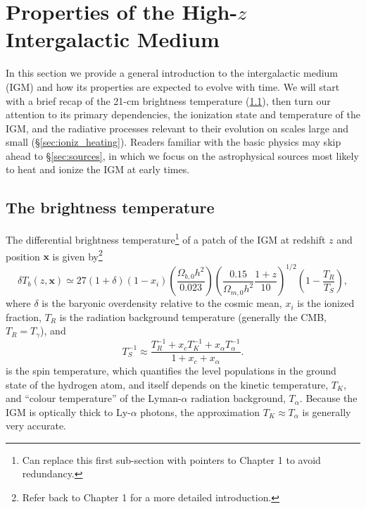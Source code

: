 \section{Properties of the High-$z$ Intergalactic Medium} \label{sec:igm}
In this section we provide a general introduction to the intergalactic medium (IGM) and how its properties are expected to evolve with time. We will start with a brief recap of the 21-cm brightness temperature (\ref{sec:dTb}), then turn our attention to its primary dependencies, the ionization state and temperature of the IGM, and the radiative processes relevant to their evolution on scales large and small (\S\ref{sec:ioniz_heating}). Readers familiar with the basic physics may skip ahead to \S\ref{sec:sources}, in which we focus on the astrophysical sources most likely to heat and ionize the IGM at early times.

\subsection{The brightness temperature} \label{sec:dTb}
The differential brightness temperature\footnote{Can replace this first sub-section with pointers to Chapter 1 to avoid redundancy.} of a patch of the IGM at redshift $z$ and position $\mathbf{x}$ is given by\footnote{Refer back to Chapter 1 for a more detailed introduction.} 
\begin{equation}
    \delta T_b(z, \mathbf{x}) \simeq 27 (1 + \delta) (1 - x_i) \left(\frac{\Omega_{b,0} h^2}{0.023} \right) \left(\frac{0.15}{\Omega_{m,0} h^2} \frac{1 + z}{10} \right)^{1/2} \left(1 - \frac{T_R}{T_S} \right) , \label{eq:dTb}
\end{equation}
where $\delta$ is the baryonic overdensity relative to the cosmic mean, $x_i$ is the ionized fraction, $T_R$ is the radiation background temperature (generally the CMB, $T_R = T_{\gamma}$), and
\begin{equation}
    T_S^{-1} \approx \frac{T_R^{-1} + x_c T_K^{-1} + x_{\alpha} T_{\alpha}^{-1}}{1 + x_c + x_{\alpha}} . \label{eq:Ts}
\end{equation}
is the spin temperature, which quantifies the level populations in the ground state of the hydrogen atom, and itself depends on the kinetic temperature, $T_K$, and ``colour temperature'' of the Lyman-$\alpha$ radiation background, $T_{\alpha}$. Because the IGM is optically thick to Ly-$\alpha$ photons, the approximation $T_K \approx T_{\alpha}$ is generally very accurate.

